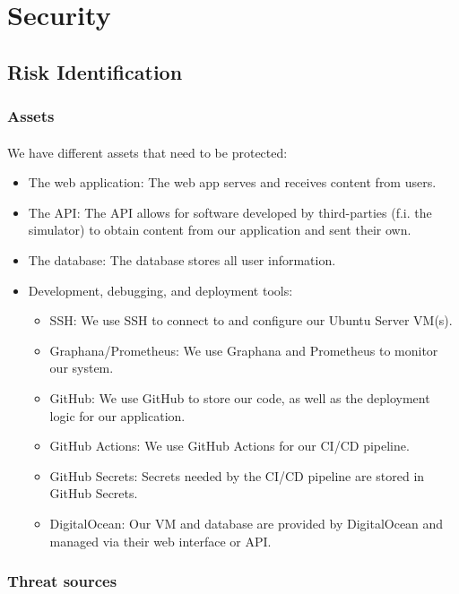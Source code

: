 \section{Security}
\subsection{Risk Identification}
\subsubsection{Assets}
\paragraph{} We have different assets that need to be protected:
\begin{itemize}
	\item The web application: The web app serves and receives content from users.
	\item The API: The API allows for software developed by third-parties (f.i. the simulator) to obtain content from our application and sent their own.
	\item The database: The database stores all user information.
	\item Development, debugging, and deployment tools:
	      \begin{itemize}
		      \item SSH: We use SSH to connect to and configure our Ubuntu Server VM(s).
		      \item Graphana/Prometheus: We use Graphana and Prometheus to monitor our system.
		      \item GitHub: We use GitHub to store our code, as well as the deployment logic for our application.
		      \item GitHub Actions: We use GitHub Actions for our CI/CD pipeline.
		      \item GitHub Secrets: Secrets needed by the CI/CD pipeline are stored in GitHub Secrets.
		      \item DigitalOcean: Our VM and database are provided by DigitalOcean and managed via their web interface or API.
	      \end{itemize}
\end{itemize}

\subsubsection{Threat sources}

